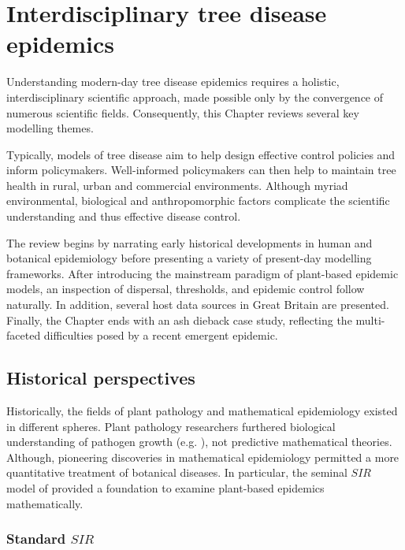 \chapter{Interdisciplinary tree disease epidemics}
\label{chapter2:litreview} 

Understanding modern-day tree disease epidemics requires a holistic, interdisciplinary scientific 
approach, made possible only by the convergence of numerous scientific fields. 
Consequently, this Chapter reviews several key modelling themes.

Typically, models of tree disease aim to help design effective control policies and inform policymakers.
Well-informed policymakers can then help to maintain tree health in rural, urban and commercial environments. 
Although myriad environmental, biological and anthropomorphic factors complicate the scientific understanding 
and thus effective disease control. 

The review begins by narrating early historical developments in human and botanical epidemiology before presenting
a variety of present-day modelling frameworks. After introducing the mainstream paradigm of plant-based epidemic models,
an inspection of dispersal, thresholds, and epidemic control follow naturally. In addition, several host data sources 
in Great Britain are presented. Finally, the Chapter ends with an ash dieback case study, reflecting the multi-faceted 
difficulties posed by a recent emergent epidemic.

\section{Historical perspectives}

Historically, the fields of plant pathology and mathematical epidemiology existed in different spheres.
Plant pathology researchers furthered biological understanding of pathogen growth (e.g. \cite{doi:10.1146/annurev.py.01.090163.000245}), not predictive mathematical theories.
Although, pioneering discoveries in mathematical epidemiology permitted a more quantitative treatment of botanical diseases. 
In particular, the seminal $SIR$ model of \cite{kermack-model} 
provided a foundation to examine plant-based epidemics mathematically.

\subsection{Standard $SIR$}

